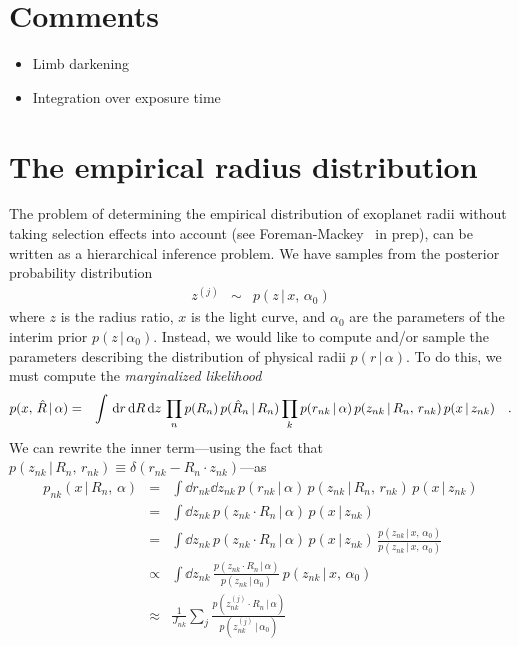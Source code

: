 \documentclass[12pt,preprint]{aastex}
\begin{document}
\section{Comments}

\begin{itemize}
\item{Limb darkening}
\item{Integration over exposure time}
\end{itemize}

\section{The empirical radius distribution}

The problem of determining the empirical distribution of exoplanet radii
without taking selection effects into account (see Foreman-Mackey \etal\ in
prep), can be written as a hierarchical inference problem.
We have samples from the posterior probability distribution
\begin{eqnarray}
z^{(j)} &\sim& p(z\,|\,x,\,\alpha_0)
\end{eqnarray}
where $z$ is the radius ratio, $x$ is the light curve, and $\alpha_0$ are the
parameters of the interim prior $p(z\,|\,\alpha_0)$.
Instead, we would like to compute and/or sample the parameters describing the
distribution of physical radii $p(r\,|\,\alpha)$.
To do this, we must compute the \emph{marginalized likelihood}
\begin{eqnarray}\eqlabel{marg-like}
p(x,\,\hat{R}\,|\,\alpha) &=&
    \int \dd r\dd R\dd z\,\prod_n p(R_n)\,p(\hat{R}_n\,|\,R_n)
        \prod_k p(r_{nk}\,|\,\alpha)\,p(z_{nk}\,|\,R_n,\,r_{nk})\,
                p(x\,|\,z_{nk}) \quad.
\end{eqnarray}
We can rewrite the inner term---using the fact that
$p(z_{nk}\,|\,R_n,\,r_{nk})\equiv\delta(r_{nk}-R_n\cdot z_{nk})$---as
\begin{eqnarray}
p_{nk}(x\,|\,R_n,\,\alpha)&=&
\int \dd r_{nk}\dd z_{nk}\,p(r_{nk}\,|\,\alpha)\,p(z_{nk}\,|\,R_n,\,r_{nk})\,
        p(x\,|\,z_{nk}) \nonumber\\
&=&
\int \dd z_{nk}\,p(z_{nk} \cdot R_n\,|\,\alpha)\,p(x\,|\,z_{nk}) \nonumber\\
&=&
\int \dd z_{nk}\,p(z_{nk}\cdot R_n\,|\,\alpha)\,p(x\,|\,z_{nk})\,
\frac{p(z_{nk}\,|\,x,\,\alpha_0)}{p(z_{nk}\,|\,x,\,\alpha_0)} \nonumber\\
&\propto&
\int \dd z_{nk}\,\frac{p(z_{nk}\cdot R_n\,|\,\alpha)}{p(z_{nk}\,|\,\alpha_0)}\,
p(z_{nk}\,|\,x,\,\alpha_0) \nonumber\\
&\approx&
\frac{1}{J_{nk}}
\sum_j \frac{p(z_{nk}^{(j)}\cdot R_n\,|\,\alpha)}{p(z_{nk}^{(j)}\,|\,\alpha_0)}
\end{eqnarray}
\end{document}
